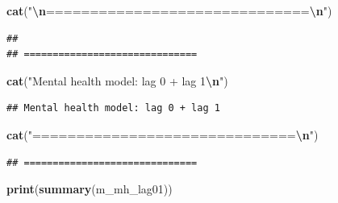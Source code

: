 \documentclass[
]{article}
\newenvironment{Shaded}{\begin{snugshade}}{\end{snugshade}}
\newcommand{\FunctionTok}[1]{\textcolor[rgb]{0.13,0.29,0.53}{\textbf{#1}}}
\newcommand{\NormalTok}[1]{#1}
\newcommand{\SpecialCharTok}[1]{\textcolor[rgb]{0.81,0.36,0.00}{\textbf{#1}}}
\newcommand{\StringTok}[1]{\textcolor[rgb]{0.31,0.60,0.02}{#1}}
\begin{document}
\begin{Shaded}
\begin{Highlighting}[]
\FunctionTok{cat}\NormalTok{(}\StringTok{"}\SpecialCharTok{\textbackslash{}n}\StringTok{==============================}\SpecialCharTok{\textbackslash{}n}\StringTok{"}\NormalTok{)}
\end{Highlighting}
\end{Shaded}

\begin{verbatim}
## 
## ==============================
\end{verbatim}

\begin{Shaded}
\begin{Highlighting}[]
\FunctionTok{cat}\NormalTok{(}\StringTok{"Mental health model: lag 0 + lag 1}\SpecialCharTok{\textbackslash{}n}\StringTok{"}\NormalTok{)}
\end{Highlighting}
\end{Shaded}

\begin{verbatim}
## Mental health model: lag 0 + lag 1
\end{verbatim}

\begin{Shaded}
\begin{Highlighting}[]
\FunctionTok{cat}\NormalTok{(}\StringTok{"==============================}\SpecialCharTok{\textbackslash{}n}\StringTok{"}\NormalTok{)}
\end{Highlighting}
\end{Shaded}

\begin{verbatim}
## ==============================
\end{verbatim}

\begin{Shaded}
\begin{Highlighting}[]
\FunctionTok{print}\NormalTok{(}\FunctionTok{summary}\NormalTok{(m\_mh\_lag01))}
\end{Highlighting}
\end{Shaded}
\end{document}
